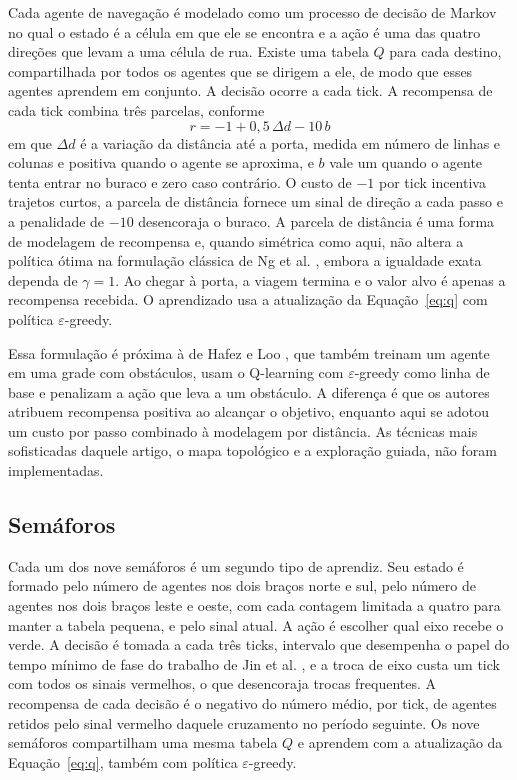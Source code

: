 \documentclass[12pt]{article}
\begin{document}
Cada agente de navegação é modelado como um processo de decisão de Markov no qual o estado é a célula em que ele se
encontra e a ação é uma das quatro direções que levam a uma célula de rua. Existe uma tabela $Q$ para cada destino,
compartilhada por todos os agentes que se dirigem a ele, de modo que esses agentes aprendem em conjunto. A decisão ocorre
a cada tick. A recompensa de cada tick combina três parcelas, conforme
\begin{equation}
  r = -1 + 0{,}5\,\Delta d - 10\,b
  \label{eq:recompensa}
\end{equation}
em que $\Delta d$ é a variação da distância até a porta, medida em número de linhas e colunas e positiva quando o agente se
aproxima, e $b$ vale um quando o agente tenta entrar no buraco e zero caso contrário. O custo de $-1$ por tick incentiva
trajetos curtos, a parcela de distância fornece um sinal de direção a cada passo e a penalidade de $-10$ desencoraja o
buraco. A parcela de distância é uma forma de modelagem de recompensa e, quando simétrica como aqui, não altera a política
ótima na formulação clássica de Ng et al. \cite{Ng1999}, embora a igualdade exata dependa de $\gamma = 1$. Ao chegar à
porta, a viagem termina e o valor alvo é apenas a recompensa recebida. O aprendizado usa a atualização da
Equação~\ref{eq:q} com política $\varepsilon$-greedy.

Essa formulação é próxima à de Hafez e Loo \cite{Hafez2015}, que também treinam um agente em uma grade com obstáculos,
usam o Q-learning com $\varepsilon$-greedy como linha de base e penalizam a ação que leva a um obstáculo. A diferença é que
os autores atribuem recompensa positiva ao alcançar o objetivo, enquanto aqui se adotou um custo por passo combinado à
modelagem por distância. As técnicas mais sofisticadas daquele artigo, o mapa topológico e a exploração guiada, não foram
implementadas.

\subsection{Semáforos}

Cada um dos nove semáforos é um segundo tipo de aprendiz. Seu estado é formado pelo número de agentes nos dois braços
norte e sul, pelo número de agentes nos dois braços leste e oeste, com cada contagem limitada a quatro para manter a
tabela pequena, e pelo sinal atual. A ação é escolher qual eixo recebe o verde. A decisão é tomada a cada três ticks,
intervalo que desempenha o papel do tempo mínimo de fase do trabalho de Jin et al. \cite{Jin2011}, e a troca de eixo custa
um tick com todos os sinais vermelhos, o que desencoraja trocas frequentes. A recompensa de cada decisão é o negativo do
número médio, por tick, de agentes retidos pelo sinal vermelho daquele cruzamento no período seguinte. Os nove semáforos
compartilham uma mesma tabela $Q$ e aprendem com a atualização da Equação~\ref{eq:q}, também com política
$\varepsilon$-greedy.
\end{document}
